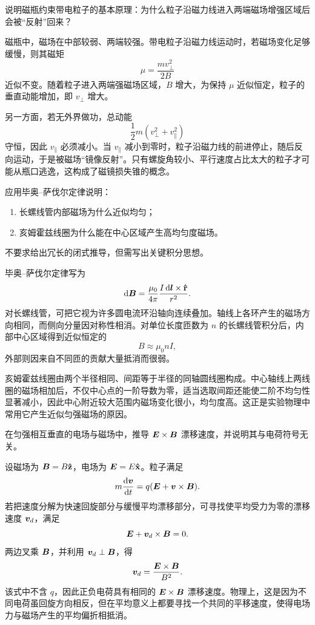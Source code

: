\begin{competition}
说明磁瓶约束带电粒子的基本原理：为什么粒子沿磁力线进入两端磁场增强区域后会被“反射”回来？

\begin{solution}
磁瓶中，磁场在中部较弱、两端较强。带电粒子沿磁力线运动时，若磁场变化足够缓慢，则其磁矩
\[
\mu=\frac{mv_\perp^2}{2B}
\]
近似不变。随着粒子进入两端强磁场区域，$B$ 增大，为保持 $\mu$ 近似恒定，粒子的垂直动能增加，即 $v_\perp$ 增大。

另一方面，若无外界做功，总动能
\[
\frac12 m(v_\perp^2+v_\parallel^2)
\]
守恒，因此 $v_\parallel$ 必须减小。当 $v_\parallel$ 减小到零时，粒子沿磁力线的前进停止，随后反向运动，于是被磁场“镜像反射”。只有螺旋角较小、平行速度占比太大的粒子才可能从瓶口逃逸，这构成了磁镜损失锥的概念。
\end{solution}
\end{competition}

\begin{university}
应用毕奥--萨伐尔定律说明：
\begin{enumerate}
  \item 长螺线管内部磁场为什么近似均匀；
  \item 亥姆霍兹线圈为什么能在中心区域产生高均匀度磁场。
\end{enumerate}
不要求给出冗长的闭式推导，但需写出关键积分思想。

\begin{solution}
毕奥--萨伐尔定律写为
\[
\dd{\vb*{B}}=\frac{\mu_0}{4\pi}\frac{I\dd{\vb*{l}}\times \vu{r}}{r^2}.
\]
对长螺线管，可把它视为许多圆电流环沿轴向连续叠加。轴线上各环产生的磁场方向相同，而侧向分量因对称性相消。对单位长度匝数为 $n$ 的长螺线管积分后，内部中心区域得到近似恒定的
\[
B\approx \mu_0 nI,
\]
外部则因来自不同匝的贡献大量抵消而很弱。

亥姆霍兹线圈由两个半径相同、间距等于半径的同轴圆线圈构成。中心轴线上两线圈的磁场相加后，不仅中心点的一阶导数为零，适当选取间距还能使二阶不均匀性显著减小，因此中心附近较大范围内磁场变化很小，均匀度高。这正是实验物理中常用它产生近似匀强磁场的原因。
\end{solution}
\end{university}

\begin{university}
在匀强相互垂直的电场与磁场中，推导 $\vb*{E}\times\vb*{B}$ 漂移速度，并说明其与电荷符号无关。

\begin{solution}
设磁场为 $\vb*{B}=B\vu{z}$，电场为 $\vb*{E}=E\vu{x}$。粒子满足
\[
m\dv{\vb*{v}}{t}=q(\vb*{E}+\vb*{v}\times \vb*{B}).
\]
若把速度分解为快速回旋部分与缓慢平均漂移部分，可寻找使平均受力为零的漂移速度 $\vb*{v}_d$，满足
\[
\vb*{E}+\vb*{v}_d\times \vb*{B}=0.
\]
两边叉乘 $\vb*{B}$，并利用 $\vb*{v}_d\perp \vb*{B}$，得
\[
\vb*{v}_d=\frac{\vb*{E}\times \vb*{B}}{B^2}.
\]
该式中不含 $q$，因此正负电荷具有相同的 $\vb*{E}\times\vb*{B}$ 漂移速度。物理上，这是因为不同电荷虽回旋方向相反，但在平均意义上都要寻找一个共同的平移速度，使得电场力与磁场产生的平均偏折相抵消。
\end{solution}
\end{university}

